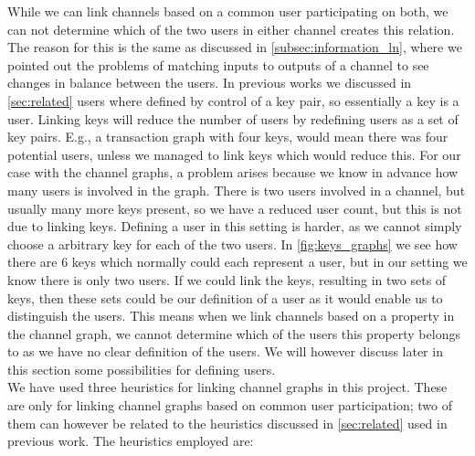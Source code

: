 While we can link channels based on a common user participating on both, we can not determine which of the two users in either channel creates this relation. 
The reason for this is the same as discussed in \cref{subsec:information_ln}, where we pointed out the problems of matching inputs to outputs of a channel to see changes in balance between the users. 
In previous works we discussed in \cref{sec:related} users where defined by control of a key pair, so essentially a key is a user.
Linking keys will reduce the number of users by redefining users as a set of key pairs.
E.g., a transaction graph with four keys, would mean there was four potential users, unless we managed to link keys which would reduce this.
For our case with the channel graphs, a problem arises because we know in advance how many users is involved in the graph.
There is two users involved in a channel, but usually many more keys present, so we have a reduced user count, but this is not due to linking keys. Defining a user in this setting is harder, as we cannot simply choose a arbitrary key for each of the two users. In \cref{fig:keys_graphs} we see how there are 6 keys which normally could each represent a user, but in our setting we know there is only two users. If we could link the keys, resulting in two sets of keys, then these sets could be our definition of a user as it would enable us to distinguish the users. This means when we link channels based on a property in the channel graph, we cannot determine which of the users this property belongs to as we have no clear definition of the users.
We will however discuss later in this section some possibilities for defining users.
\\

We have used three heuristics for linking channel graphs in this project.
These are only for linking channel graphs based on common user participation; two of them can however be related to the heuristics discussed in \cref{sec:related} used in previous work. The heuristics employed are:

